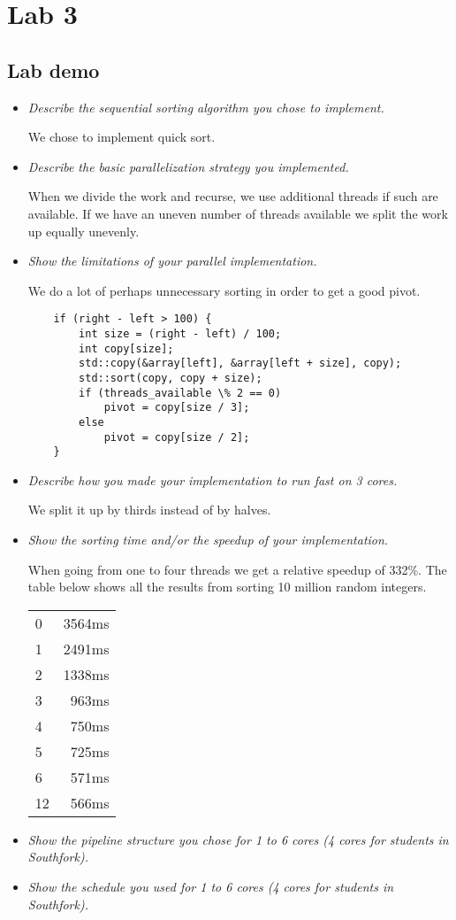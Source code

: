 \documentclass[a4paper,12pt]{article}
\begin{document}
\section{Lab 3}


\subsection{Lab demo}

\begin{itemize}

\item \textit{Describe the sequential sorting algorithm you chose to implement.}

  We chose to implement quick sort.


\item \textit{Describe the basic parallelization strategy you implemented.}

  When we divide the work and recurse, we use additional threads if such are available. If we have an uneven number of threads available we split the work up equally unevenly.


\item \textit{Show the limitations of your parallel implementation.}

  We do a lot of perhaps unnecessary sorting in order to get a good pivot.

  \begin{lstlisting}
	if (right - left > 100) {
		int size = (right - left) / 100;
		int copy[size];
		std::copy(&array[left], &array[left + size], copy);
		std::sort(copy, copy + size);
		if (threads_available \% 2 == 0)
			pivot = copy[size / 3];
		else
			pivot = copy[size / 2];
	}
  \end{lstlisting}


\item \textit{Describe how you made your implementation to run fast on 3 cores.}

  We split it up by thirds instead of by halves.


\item \textit{Show the sorting time and/or the speedup of your implementation.}

  When going from one to four threads we get a relative speedup of 332\%. The table below shows all the results from sorting 10 million random integers.

  \begin{tabular}{ l r }
    0 & 3564ms \\
    1 & 2491ms \\
    2 & 1338ms \\
    3 & 963ms \\
    4 & 750ms \\
    5 & 725ms \\
    6 & 571ms \\
    12 & 566ms \\
  \end{tabular}


\item \textit{Show the pipeline structure you chose for 1 to 6 cores (4 cores for students in
Southfork).}

\item \textit{Show the schedule you used for 1 to 6 cores (4 cores for students in Southfork).}

\end{itemize}
\end{document}
